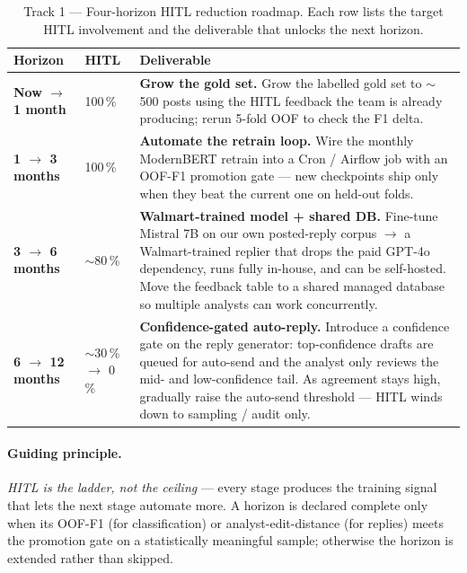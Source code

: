 \renewcommand{\arraystretch}{1.35}
\begin{table}[htbp]
\centering
\small
\begin{tabularx}{\linewidth}{@{}p{2.6cm} p{2.1cm} X@{}}
\toprule
\textbf{Horizon} & \textbf{HITL} & \textbf{Deliverable} \\
\midrule
\rowcolor{zebra}
\textcolor{hzGreen}{\textbf{Now $\to$ 1 month}} &
100\,\% &
\textbf{Grow the gold set.}  Grow the labelled gold set to
$\sim$500 posts using the HITL feedback the team is already producing;
rerun 5-fold OOF to check the F1 delta. \\

\textcolor{hzBlue}{\textbf{1 $\to$ 3 months}} &
100\,\% &
\textbf{Automate the retrain loop.}  Wire the monthly ModernBERT
retrain into a Cron / Airflow job with an OOF-F1 promotion gate --- new
checkpoints ship only when they beat the current one on held-out folds. \\

\rowcolor{zebra}
\textcolor{hzPurple}{\textbf{3 $\to$ 6 months}} &
$\sim$80\,\% &
\textbf{Walmart-trained model + shared DB.}  Fine-tune Mistral 7B on
our own posted-reply corpus $\to$ a Walmart-trained replier that drops
the paid GPT-4o dependency, runs fully in-house, and can be self-hosted.
Move the feedback table to a shared managed database so multiple
analysts can work concurrently. \\

\textcolor{hzAmber}{\textbf{6 $\to$ 12 months}} &
$\sim$30\,\% $\to$ 0\,\% &
\textbf{Confidence-gated auto-reply.}  Introduce a confidence gate on
the reply generator: top-confidence drafts are queued for auto-send and
the analyst only reviews the mid- and low-confidence tail.  As
agreement stays high, gradually raise the auto-send threshold --- HITL
winds down to sampling / audit only. \\
\bottomrule
\end{tabularx}
\caption{Track 1 --- Four-horizon HITL reduction roadmap.  Each row
lists the target HITL involvement and the deliverable that unlocks the
next horizon.}\label{tab:future:horizons}
\end{table}
\renewcommand{\arraystretch}{1.0}

\paragraph{Guiding principle.}
\emph{HITL is the ladder, not the ceiling} --- every stage produces the
training signal that lets the next stage automate more.  A horizon is
declared complete only when its OOF-F1 (for classification) or
analyst-edit-distance (for replies) meets the promotion gate on a
statistically meaningful sample; otherwise the horizon is extended
rather than skipped.

